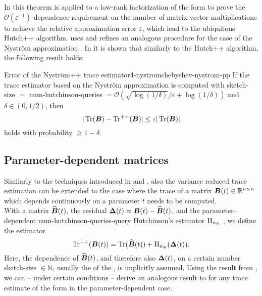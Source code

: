 In \cite{meyer2021hutch} this theorem is applied to a low-rank factorization of
the form  to prove the $\mathcal{O}(\varepsilon^{-1})$-dependence
requirement on the number of matrix-vector multiplications to achieve the relative
approximation error $\varepsilon$, which lead to the ubiquitous Hutch++ algorithm.
\cite{lin2017randomized} uses and \cite{persson2022hutch} refines an analogous procedure for the
case of the Nystr\"om approximation . In \cite[theorem~3.4]{persson2022hutch}
it is shown that similarly to the Hutch++ algorithm, the following result holds:
\begin{theorem}{Error of the Nystr\"om++ trace estimator}{4-nystromchebyshev-nystrom-pp}
    If the trace estimator  based
    on the Nystr\"om approximation  is computed
    with \gls{sketch-size} $=$ \gls{num-hutchinson-queries} $= \mathcal{O}(\sqrt{\log(1/\delta)}/\varepsilon + \log(1/\delta))$
    and $\delta \in (0, 1/2)$, then
    \begin{equation}
        |\operatorname{Tr}(\boldsymbol{B}) - \operatorname{Tr}^{++}(\boldsymbol{B})| \leq \varepsilon |\operatorname{Tr}(\boldsymbol{B})|
    \end{equation}
    holds with probability $\geq 1-\delta$.
\end{theorem}

\subsection{Parameter-dependent matrices}
\label{subsec:4-nystromchebyshev-reduction-parametrized-matrices}

Similarly to the techniques introduced in  and ,
also the variance reduced trace estimation can be extended to the case where
the trace of a matrix $\boldsymbol{B}(t) \in \mathbb{R}^{n \times n}$ which depends continuously on a parameter $t$
needs to be computed.\\

With a matrix $\widehat{\boldsymbol{B}}(t)$, the residual $\boldsymbol{\Delta}(t) = \boldsymbol{B}(t) - \widehat{\boldsymbol{B}}(t)$,
and the parameter-dependent \gls{num-hutchinson-queries}-query Hutchinson's estimator $\operatorname{H}_{n_{\Psi}}$
, we define the estimator 
\begin{equation}
    \operatorname{Tr}^{++}(\boldsymbol{B}(t)) = \operatorname{Tr}(\widehat{\boldsymbol{B}}(t)) + \operatorname{H}_{n_{\Psi}}(\boldsymbol{\Delta}(t)).
    \label{equ:4-nystromchebyshev-parameter-hutch-pp}
\end{equation}
Here, the dependence of $\widehat{\boldsymbol{B}}(t)$, and therefore also $\boldsymbol{\Delta}(t)$,
on a certain number \gls{sketch-size} $\in \mathbb{N}$, usually the 
of the , is implicitly assumed.
Using the result from ,
we can -- under certain conditions -- derive an analogous result
to  for any trace estimate of the form
 in the parameter-dependent case.

